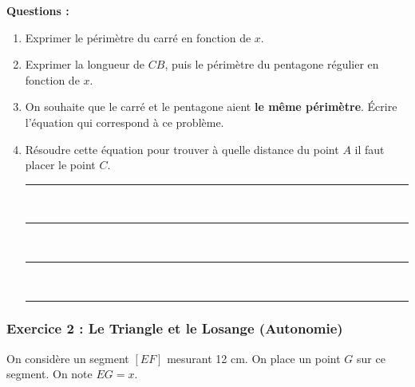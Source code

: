 \documentclass[11pt,a4paper]{article}
\begin{document}
\vspace{0.5cm}
\noindent \textbf{Questions :}
\begin{enumerate}
    \item Exprimer le périmètre du carré en fonction de $x$. \dotfill \\
    \item Exprimer la longueur de $CB$, puis le périmètre du pentagone régulier en fonction de $x$. \dotfill \\
    \item On souhaite que le carré et le pentagone aient \textbf{le même périmètre}. Écrire l'équation qui correspond à ce problème. \dotfill \\
    \item Résoudre cette équation pour trouver à quelle distance du point $A$ il faut placer le point $C$. \\
    \rule{\linewidth}{0.1pt} \\[-2mm]
    \rule{\linewidth}{0.1pt} \\[-2mm]
    \rule{\linewidth}{0.1pt} \\[-2mm]
    \rule{\linewidth}{0.1pt}
\end{enumerate}

\vspace{1.5cm}

\subsubsection*{Exercice 2 : Le Triangle et le Losange (Autonomie)}

On considère un segment $[EF]$ mesurant 12 cm. On place un point $G$ sur ce segment. On note $EG = x$.

\begin{center}
\end{center}
\end{document}
